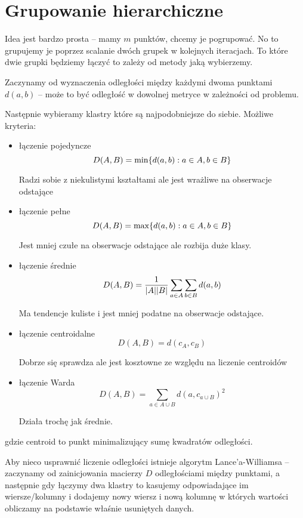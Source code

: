 \section{Grupowanie hierarchiczne}

Idea jest bardzo prosta -- mamy \( m \) punktów, chcemy je pogrupować.
No to grupujemy je poprzez scalanie dwóch grupek w kolejnych iteracjach.
To które dwie grupki będziemy łączyć to zależy od metody jaką wybierzemy.

Zaczynamy od wyznaczenia odległości między każdymi dwoma punktami \( d(a, b) \) -- może to być odległość w dowolnej metryce w zależności od problemu.

Następnie wybieramy klastry które są najpodobniejsze do siebie.
Możliwe kryteria:
\begin{itemize}
    \item łączenie pojedyncze 
    \[
        D(A, B) = \min\braces{d(a, b) : a \in A, b \in B}
    \]
    
    Radzi sobie z niekulistymi kształtami ale jest wrażliwe na obserwacje odstające
    
    \item łączenie pełne
    \[
        D(A, B) = \max\braces{d(a, b) : a \in A, b \in B}
    \]
    
    Jest mniej czułe na obserwacje odstające ale rozbija duże klasy.
    
    \item łączenie średnie
    \[
        D(A, B) = \frac{1}{\card{A}\card{B}}\sum_{a\in A}\sum_{b \in B}d(a, b)
    \]
    
    Ma tendencje kuliste i jest mniej podatne na obserwacje odstające.
    
    \item łączenie centroidalne
    \[
        D(A, B) = d(c_A, c_B)
    \]
    
    Dobrze się sprawdza ale jest kosztowne ze względu na liczenie centroidów
    
    \item łączenie Warda
    \[
        D(A, B) = \sum_{a \in A \cup B} d(a, c_{a \cup B})^2
    \]
    
    Działa trochę jak średnie.
    
\end{itemize}
gdzie centroid to punkt minimalizujący sumę kwadratów odległości.

Aby nieco usprawnić liczenie odległości istnieje algorytm Lance'a-Williamsa -- zaczynamy od zainicjowania macierzy \( D \) odległościami między punktami, a następnie gdy łączymy dwa klastry to kasujemy odpowiadające im wiersze/kolumny i dodajemy nowy wiersz i nową kolumnę w których wartości obliczamy na podstawie właśnie usuniętych danych.



